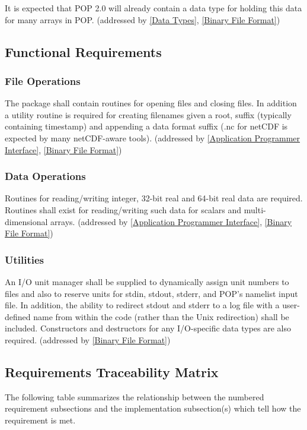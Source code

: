 \documentclass[11pt]{article}
\begin{document}
\noindent
It is expected that POP 2.0 will already contain a data type 
for holding this data for many arrays in POP. 
(addressed by \ref{Data Types}, \ref{Binary File Format})

\subsection{Functional Requirements}

\subsubsection{File Operations}
\label{File Operations}
The package shall contain routines for opening files and closing files.  
In addition a utility routine is required for creating filenames 
given a root, suffix (typically containing timestamp) 
and appending a data format suffix 
(.nc for netCDF is expected by many netCDF-aware tools). 
(addressed by \ref{Application Programmer Interface}, \ref{Binary File Format})

\subsubsection{Data Operations}
\label{Data Operations}
Routines for reading/writing integer, 32-bit real and 64-bit 
real data are required.  
Routines shall exist for reading/writing such data for scalars 
and multi-dimensional arrays.
(addressed by \ref{Application Programmer Interface}, \ref{Binary File Format})

\subsubsection{Utilities}
\label{Utilities}
An I/O unit manager shall be supplied to dynamically assign 
unit numbers to files and also to reserve units for stdin, 
stdout, stderr, and POP's namelist input file.  
In addition, the ability to redirect stdout and stderr to a 
log file with a user-defined name from within the code 
(rather than the Unix redirection) shall be included.  
Constructors and destructors for any I/O-specific data 
types are also required.
(addressed by \ref{Binary File Format})

\subsection{Requirements Traceability Matrix}
The following table summarizes the relationship between the 
numbered requirement subsections and the implementation 
subsection(s) which tell how the requirement is met.
\end{document}
